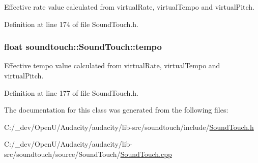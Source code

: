 Effective \textquotesingle{}rate\textquotesingle{} value calculated from \textquotesingle{}virtual\+Rate\textquotesingle{}, \textquotesingle{}virtual\+Tempo\textquotesingle{} and \textquotesingle{}virtual\+Pitch\textquotesingle{}. 



Definition at line 174 of file Sound\+Touch.\+h.

\subsubsection[{\texorpdfstring{tempo}{tempo}}]{\setlength{\rightskip}{0pt plus 5cm}float soundtouch\+::\+Sound\+Touch\+::tempo\hspace{0.3cm}{\ttfamily [protected]}}\hypertarget{classsoundtouch_1_1_sound_touch_ad4687df9f1a419f6ac7aff28b5bea3a6}{}\label{classsoundtouch_1_1_sound_touch_ad4687df9f1a419f6ac7aff28b5bea3a6}


Effective \textquotesingle{}tempo\textquotesingle{} value calculated from \textquotesingle{}virtual\+Rate\textquotesingle{}, \textquotesingle{}virtual\+Tempo\textquotesingle{} and \textquotesingle{}virtual\+Pitch\textquotesingle{}. 



Definition at line 177 of file Sound\+Touch.\+h.



The documentation for this class was generated from the following files\+:\begin{DoxyCompactItemize}
\item 
C\+:/\+\_\+dev/\+Open\+U/\+Audacity/audacity/lib-\/src/soundtouch/include/\hyperlink{_sound_touch_8h}{Sound\+Touch.\+h}\item 
C\+:/\+\_\+dev/\+Open\+U/\+Audacity/audacity/lib-\/src/soundtouch/source/\+Sound\+Touch/\hyperlink{_sound_touch_8cpp}{Sound\+Touch.\+cpp}\end{DoxyCompactItemize}
